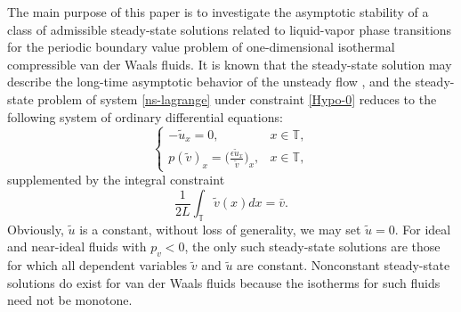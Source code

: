 \documentclass[a4paper,oneside,11pt]{article}
\numberwithin{equation}{section}
\begin{document}
The main purpose of this paper is to investigate the asymptotic stability of a class of admissible steady-state solutions related to liquid-vapor phase transitions for the periodic boundary value problem of one-dimensional isothermal compressible van der Waals fluids. 
It is known that the steady-state solution may describe the long-time asymptotic behavior of the unsteady flow 
, and the steady-state problem of system \eqref{ns-lagrange} under constraint \eqref{Hypo-0} reduces to the following system of ordinary differential equations:
\begin{equation}\label{steady-state ns-lagrange}
\left\{\begin{array}{llll}
\displaystyle -\tilde{u}_{x}=0,& x\in \mathbb{T},\\
\displaystyle p(\tilde{v})_{x}=\big(\frac{\epsilon\tilde{u}_{x}}{\tilde{v}}\big)_{x}, & x\in \mathbb{T}, %
\end{array}\right.
\end{equation}
supplemented by the integral constraint
\begin{equation}\label{constraint for v,u}
\frac{1}{2L}\int_{\mathbb{T}}\tilde{v}(x)dx = \bar v.
\end{equation}
Obviously, \(\tilde{u}\) is a constant, without loss of generality, we may set \(\tilde{u}= 0\).
For ideal and near-ideal fluids with $p_v < 0$, the only such steady-state solutions are those for which all dependent variables $\tilde{v}$ and $\tilde{u}$ are constant. Nonconstant steady-state solutions do exist for van der Waals fluids because the isotherms for such fluids need not be monotone. 
\end{document}

